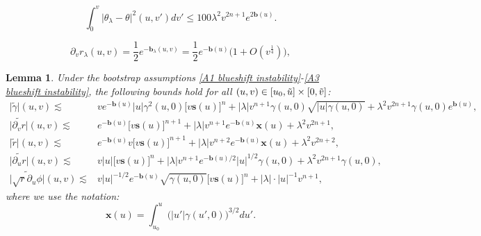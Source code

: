 \documentclass[10pt,a4paper]{amsart}
\newtheorem{lemma}{Lemma}
\begin{document}
\begin{equation}\label{A3 blueshift instability}
    \int_0^v\big|\theta_{\lambda}-\theta\big|^2(u,v')dv'\leq 100\lambda^2v^{2n+1}e^{2\mathbf{b}(u)}.
\end{equation}

\begin{equation}\label{dv r lambda in terms of b(u)}
    \partial_vr_{\lambda}(u,v)=\frac{1}{2}e^{-\mathbf{b}_{\lambda}(u,v)}=\frac{1}{2}e^{-\mathbf{b}(u)}\big(1+O(v^{\frac{1}{4}})\big),
\end{equation}

\begin{lemma}
    Under the bootstrap assumptions \eqref{A1 blueshift instability}-\eqref{A3 blueshift instability}, the following bounds hold for all $(u,v)\in[u_0,\Tilde{u}]\times[0,\Tilde{v}]$:
    \begin{align}
        \big|\widetilde{\gamma}\big|(u,v)\lesssim& ve^{-\mathbf{b}(u)}|u|\gamma^2(u,0)\big[v\mathbf{s}(u)\big]^{n}+|\lambda| v^{n+1}\gamma(u,0)\sqrt{|u|\gamma(u,0)}+\lambda^2v^{2n+1}\gamma(u,0)e^{\mathbf{b}(u)},\label{blueshift lemma bound 1}\\
        \big|\widetilde{\partial_vr}\big|(u,v)\lesssim& e^{-\mathbf{b}(u)}\big[v\mathbf{s}(u)\big]^{n+1}+|\lambda|v^{n+1}e^{-\mathbf{b}(u)}\mathbf{x}(u)+\lambda^2v^{2n+1},\label{blueshift lemma bound 2}\\
        \big|\widetilde{r}\big|(u,v)\lesssim & e^{-\mathbf{b}(u)}v\big[v\mathbf{s}(u)\big]^{n+1}+|\lambda| v^{n+2}e^{-\mathbf{b}(u)}\mathbf{x}(u)+\lambda^2v^{2n+2},\label{blueshift lemma bound 3}\\
        \big|\widetilde{\partial_ur}\big|(u,v)\lesssim& v|u|\big[v\mathbf{s}(u)\big]^{n}+|\lambda| v^{n+1}e^{-\mathbf{b}(u)/2}|u|^{1/2}\gamma(u,0)+\lambda^2 v^{2n+1}\gamma(u,0),\label{blueshift lemma bound 4}\\
        \big|\widetilde{\sqrt{r}\partial_u\phi}\big|(u,v)\lesssim& v|u|^{-1/2}e^{-\mathbf{b}(u)}\sqrt{\gamma(u,0)}\big[v\mathbf{s}(u)\big]^{n}+|\lambda|\cdot|u|^{-1}v^{n+1},\label{blueshift lemma bound 5}
    \end{align}
    where we use the notation:
    \[\mathbf{x}(u)=\int_{u_0}^u\big(|u'|\gamma(u',0)\big)^{3/2}du'.\]
\end{lemma}
\end{document}
